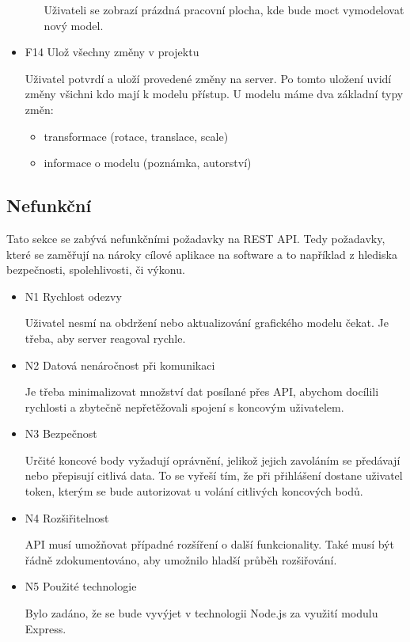 \documentclass[thesis=B,czech]{FITthesis}[2012/06/26]
\begin{document}
\begin{itemize}
\begin{itemize}
                    Uživateli se zobrazí prázdná pracovní plocha, kde bude moct vymodelovat nový model.
                \end{itemize}
                \item F14 Ulož všechny změny v projektu
                
                Uživatel potvrdí a uloží provedené změny na server. Po tomto uložení uvidí změny všichni kdo mají k modelu přístup.
                U modelu máme dva základní typy změn:
                \begin{itemize}
                    \item transformace (rotace, translace, scale)
                    \item informace o modelu (poznámka, autorství)
                \end{itemize}
            \end{itemize}
        \subsection{Nefunkční}
            Tato sekce se zabývá nefunkčními požadavky na REST API. Tedy požadavky, které se zaměřují na nároky cílové aplikace na software a to například z hlediska bezpečnosti, spolehlivosti, či výkonu.
            \begin{itemize}
                \item N1 Rychlost odezvy

                    Uživatel nesmí na obdržení nebo aktualizování grafického modelu čekat. Je třeba, aby server reagoval rychle.
                \item N2 Datová nenáročnost při komunikaci

                    Je třeba minimalizovat množství dat posílané přes API, abychom docílili rychlosti a zbytečně nepřetěžovali spojení s koncovým uživatelem.
                \item N3 Bezpečnost
                    
                    Určité koncové body vyžadují oprávnění, jelikož jejich zavoláním se předávají nebo přepisují citlivá data. To se vyřeší tím, že při přihlášení dostane uživatel token, kterým se bude autorizovat u volání citlivých koncových bodů.
                \item N4 Rozšiřitelnost

                    API musí umožňovat případné rozšíření o další funkcionality. Také musí být řádně zdokumentováno, aby umožnilo hladší průběh rozšiřování.
                \item N5 Použité technologie

                    Bylo zadáno, že se bude vyvýjet v technologii Node.js za využití modulu Express.
            \end{itemize}
\end{document}
